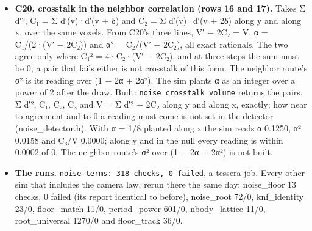 \begin{enumerate}
\begin{itemize}
\item \textbf{C20, crosstalk in the neighbor correlation (rows 16 and 17).} Takes Σ d′², C₁ = Σ d′(v)·d′(v + δ) and C₂ = Σ d′(v)·d′(v + 2δ) along y and along x, over the same voxels. From C20's three lines, V′ − 2C₂ = V, α = C₁/(2·(V′ − 2C₂)) and α² = C₂/(V′ − 2C₂), all exact rationals. The two agree only where C₁² = 4·C₂·(V′ − 2C₂), and at three steps the sum must be 0; a pair that fails either is not crosstalk of this form. The neighbor route's σ² is its reading over (1 − 2α + 2α²). The sim plants α as an integer over a power of 2 after the draw. Built: \texttt{noise\_\allowbreak{}crosstalk\_\allowbreak{}volume} returns the pairs, Σ d′², C₁, C₂, C₃ and V = Σ d′² − 2C₂ along y and along x, exactly; how near to agreement and to 0 a reading must come is not set in the detector (noise\_\allowbreak{}detector.h). With α = 1/8 planted along x the sim reads α 0.1250, α² 0.0158 and C₃/V 0.0000; along y and in the null every reading is within 0.0002 of 0. The neighbor route's σ² over (1 − 2α + 2α²) is not built.
\item \textbf{The runs.} \texttt{noise terms: 318 checks, 0 failed}, a tessera job. Every other sim that includes the camera law, rerun there the same day: noise\_\allowbreak{}floor 13 checks, 0 failed (its report identical to before), noise\_\allowbreak{}root 72/0, knf\_\allowbreak{}identity 23/0, floor\_\allowbreak{}match 11/0, period\_\allowbreak{}power 601/0, nbody\_\allowbreak{}lattice 11/0, root\_\allowbreak{}universal 1270/0 and floor\_\allowbreak{}track 36/0.
\end{itemize}
\end{enumerate}
